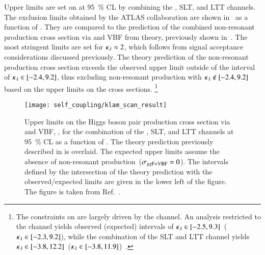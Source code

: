 Upper limits are set on \xsecggfvbf at \SI{95}{\percent} CL by combining the
\hadhad, \lephad SLT, and \lephad LTT channels. The exclusion limits obtained by
the ATLAS collaboration are shown in~ as a function of
\klambda. They are compared to the prediction of the combined non-resonant \HH
production cross section via \ggF and VBF from theory, previously shown
in~. The most stringent limits are set for
$\kappa_{\lambda} \approx 2$, which follows from signal acceptance considerations
discussed previously. The theory prediction of the non-resonant \HH production
cross section exceeds the observed upper limit outside of the interval of
\mbox{$\kappa_{\lambda} \in [-2.4, 9.2]$}, thus excluding non-resonant \HH production
with \mbox{$\kappa_{\lambda} \notin [-2.4, 9.2]$} based on the upper limits on the cross
sections.%
\footnote{The constraints on \klambda are largely driven by the \hadhad
  channel. An analysis restricted to the \hadhad channel yields observed
  (expected) \klambda intervals of $\kappa_{\lambda} \in [ -2.5, 9.3
  ]$~($\kappa_{\lambda} \in [ -2.3, 9.2 ]$), while the combination of the \lephad SLT
  and LTT channel yields $\kappa_{\lambda} \in [ -3.8, 12.2
  ]$~($\kappa_{\lambda} \in [ -3.8, 11.9 ]$)~\cite{Dimitriadi}.}

\begin{figure}[htbp]
  \centering

  \texttt{[image: self\_coupling/klam\_scan\_result]}

  \caption[Upper limits on the Higgs boson pair production cross section via
  \ggF and VBF for the combination of the \hadhad, \lephad SLT, and \lephad LTT
  channels at \SI{95}{\percent} CL as a function of \klambda.]{Upper limits on
    the Higgs boson pair production cross section via \ggF and VBF, \xsecggfvbf,
    for the combination of the \hadhad, \lephad SLT, and \lephad LTT channels at
    \SI{95}{\percent} CL as a function of \klambda. The theory prediction
    previously described in  is overlaid. The expected
    upper limits assume the absence of non-resonant \HH
    production~($\sigma_{gg\text{F+VBF}} = 0$). The \klambda intervals defined by the
    intersection of the theory prediction with the observed/expected limits are
    given in the lower left of the figure. The figure is taken from
    Ref.~\cite{ATLAS-CONF-2021-052}.}%
  \label{fig:klambda_scan}
\end{figure}

